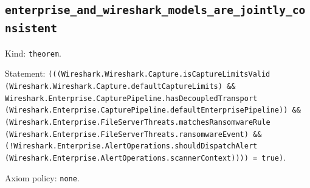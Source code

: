 \documentclass[11pt]{article}
\begin{document}
\subsection*{\texttt{enterprise\_and\_wireshark\_models\_are\_jointly\_consistent}}
\noindent Kind: \texttt{theorem}.\par
\noindent Statement: \texttt{(((Wireshark.Wireshark.Capture.isCaptureLimitsValid (Wireshark.Wireshark.Capture.defaultCaptureLimits) \&\& Wireshark.Enterprise.CapturePipeline.hasDecoupledTransport (Wireshark.Enterprise.CapturePipeline.defaultEnterprisePipeline)) \&\& (Wireshark.Enterprise.FileServerThreats.matchesRansomwareRule (Wireshark.Enterprise.FileServerThreats.ransomwareEvent) \&\& (!Wireshark.Enterprise.AlertOperations.shouldDispatchAlert (Wireshark.Enterprise.AlertOperations.scannerContext)))) = true)}.\par
\noindent Axiom policy: \texttt{none}.\par
\end{document}
